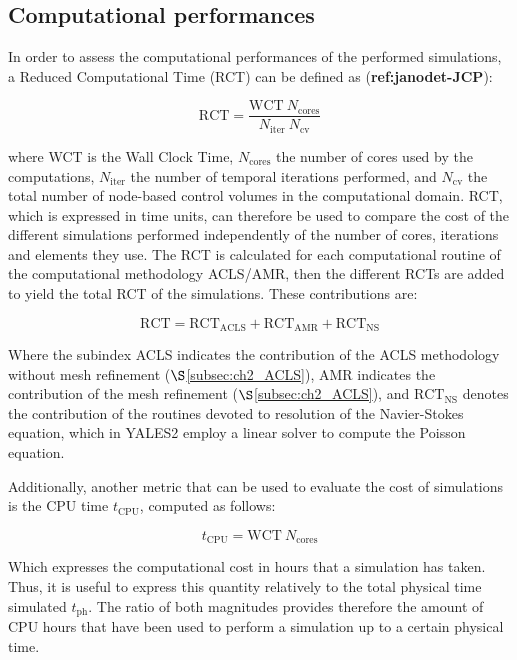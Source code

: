 \subsection{Computational performances}

In order to assess the computational performances of the performed simulations, a Reduced Computational Time (RCT) can be defined as (\textbf{ref:janodet-JCP}):

\begin{equation}
\mathrm{RCT} = \frac{\mathrm{WCT} ~ N_\mathrm{cores}}{N_\mathrm{iter}~N_\mathrm{cv}}
\end{equation}

where WCT is the Wall Clock Time, $N_\mathrm{cores}$ the number of cores used by the computations, $N_\mathrm{iter}$ the number of temporal iterations performed, and $N_\mathrm{cv}$ the total number of node-based control volumes in the computational domain. RCT, which is expressed in time units, can therefore be used to compare the cost of the different simulations performed independently of the number of cores, iterations and elements they use. The RCT is calculated for each computational routine of the computational methodology ACLS/AMR, then the different RCTs are added to yield the total RCT of the simulations. These contributions are:

\begin{equation}
\mathrm{RCT} = \mathrm{RCT}_\mathrm{ACLS} + \mathrm{RCT}_\mathrm{AMR} + \mathrm{RCT}_\mathrm{NS}
\end{equation}

Where the subindex ACLS indicates the contribution of the ACLS methodology without mesh refinement ($\S$\ref{subsec:ch2_ACLS}), AMR indicates the contribution of the mesh refinement ($\S$\ref{subsec:ch2_ACLS}), and $\mathrm{RCT}_\mathrm{NS}$ denotes the contribution of the routines devoted to resolution of the Navier-Stokes equation, which in YALES2 employ a linear solver to compute the Poisson equation.

Additionally, another metric that can be used to evaluate the cost of simulations is the CPU time $t_\mathrm{CPU}$, computed as follows:

\begin{equation}
t_\mathrm{CPU} = \mathrm{WCT} ~ N_\mathrm{cores}
\end{equation}

Which expresses the computational cost in hours that a simulation has taken. Thus, it is useful to express this quantity relatively to the total physical time simulated $t_\mathrm{ph}$. The ratio of both magnitudes provides therefore the amount of CPU hours that have been used to perform a simulation up to a certain physical time.

